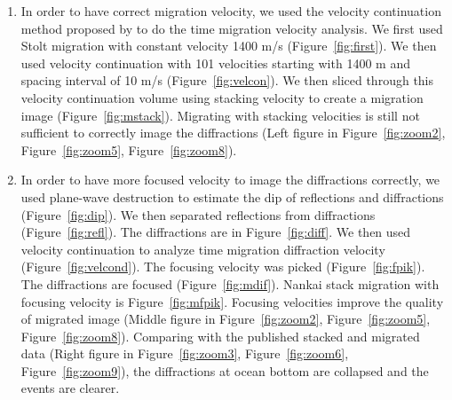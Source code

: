\begin{enumerate}

\item In order to have correct migration velocity, we used the velocity continuation method proposed by \cite[]{VCZO} to do the time migration velocity analysis. We first used Stolt migration with constant velocity 1400 m/s (Figure~\ref{fig:first}). We then used velocity continuation with 101 velocities starting with 1400 m and spacing interval of 10 m/s (Figure~\ref{fig:velcon}). We then sliced through this velocity continuation volume using stacking velocity to create a migration image (Figure~\ref{fig:mstack}). Migrating with stacking velocities is still not sufficient to correctly image the diffractions (Left figure in Figure~\ref{fig:zoom2}, Figure~\ref{fig:zoom5}, Figure~\ref{fig:zoom8}).  

\item In order to have more focused velocity to image the diffractions correctly, we used plane-wave destruction \cite[]{PWD} to estimate the dip of reflections and diffractions (Figure~\ref{fig:dip}). We then separated reflections from diffractions (Figure~\ref{fig:refl}). The diffractions are in Figure~\ref{fig:diff}. We then used velocity continuation to analyze time migration diffraction velocity (Figure~\ref{fig:velcond}). The focusing velocity was picked (Figure~\ref{fig:fpik}). The diffractions are focused (Figure~\ref{fig:mdif}). Nankai stack migration with focusing velocity is Figure~\ref{fig:mfpik}. Focusing velocities improve the quality of migrated image (Middle figure in Figure~\ref{fig:zoom2}, Figure~\ref{fig:zoom5}, Figure~\ref{fig:zoom8}). Comparing with the published stacked and migrated data (Right figure in Figure~\ref{fig:zoom3}, Figure~\ref{fig:zoom6}, Figure~\ref{fig:zoom9}), the diffractions at ocean bottom are collapsed and the events are clearer.       


\end{enumerate}\clearpage

